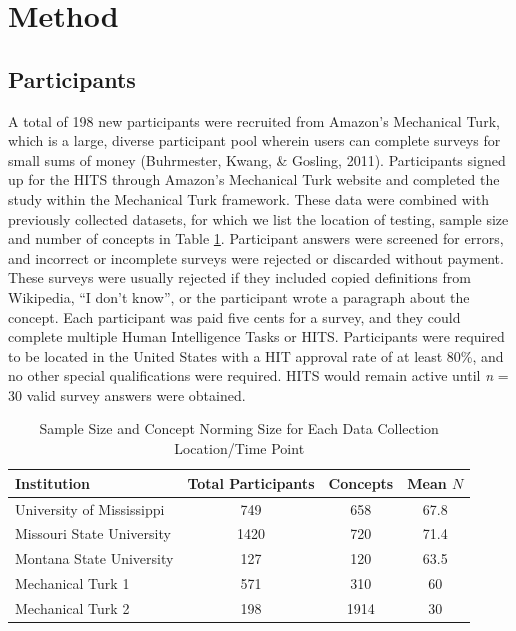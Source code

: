 \documentclass[english,,man]{apa6}
\begin{document}
\hypertarget{method}{%
\section{Method}\label{method}}

\hypertarget{participants}{%
\subsection{Participants}\label{participants}}

A total of 198 new participants were recruited from Amazon's Mechanical Turk, which is a large, diverse participant pool wherein users can complete surveys for small sums of money (Buhrmester, Kwang, \& Gosling, 2011). Participants signed up for the HITS through Amazon's Mechanical Turk website and completed the study within the Mechanical Turk framework. These data were combined with previously collected datasets, for which we list the location of testing, sample size and number of concepts in Table \ref{tab:part-table}. Participant answers were screened for errors, and incorrect or incomplete surveys were rejected or discarded without payment. These surveys were usually rejected if they included copied definitions from Wikipedia, \enquote{I don't know}, or the participant wrote a paragraph about the concept. Each participant was paid five cents for a survey, and they could complete multiple Human Intelligence Tasks or HITS. Participants were required to be located in the United States with a HIT approval rate of at least 80\%, and no other special qualifications were required. HITS would remain active until \emph{n} = 30 valid survey answers were obtained.

\begin{table}[tbp]
\begin{center}
\begin{threeparttable}
\caption{\label{tab:part-table}Sample Size and Concept Norming Size for Each Data Collection Location/Time Point}
\begin{tabular}{lccc}
\toprule
Institution & Total Participants & Concepts & Mean $N$\\
\midrule
University of Mississippi & 749 & 658 & 67.8\\
Missouri State University & 1420 & 720 & 71.4\\
Montana State University & 127 & 120 & 63.5\\
Mechanical Turk 1 & 571 & 310 & 60\\
Mechanical Turk 2 & 198 & 1914 & 30\\
\bottomrule
\end{tabular}
\end{threeparttable}
\end{center}
\end{table}
\end{document}
